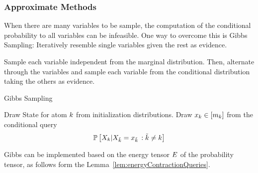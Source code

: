 \subsubsection{Approximate Methods}

When there are many variables to be sample, the computation of the conditional probability to all variables can be infeasible.
One way to overcome this is Gibbs Sampling: Iteratively resemble single variables given the rest as evidence.


Sample each variable independent from the marginal distribution.
Then, alternate through the variables and sample each variable from the conditional distribution taking the others as evidence.

\begin{algorithm}[hbt!]
\caption{Gibbs Sampling}\label{alg:Gibbs}
\begin{algorithmic}
\For{$\catenumeratorin$}
	\State Draw State for atom $k$ from initialization distributions. %
\EndFor
{}
\For{$\catenumeratorin$}
	\State Draw $x_{k}\in[m_{k}]$ from the conditional query
		\[ \mathbb{P}\left[X_{k}|X_{\tilde{k}}=x_{\tilde{k}}\, : \tilde{k} \neq k\right] \]
\EndFor
\EndWhile
\end{algorithmic}
\end{algorithm}



Gibbs can be implemented based on the energy tensor $E$ of the probability tensor, as follows form the Lemma~\ref{lem:energyContractionQueries}.



	


